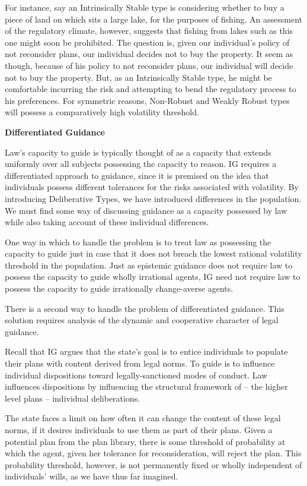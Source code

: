 For instance, say an Intrinsically Stable type is considering whether to
buy a piece of land on which sits a large lake, for the purposes of
fishing. An assessment of the regulatory climate, however, suggests that
fishing from lakes such as this one might soon be prohibited. The
question is, given our individual's policy of not reconsider plans, our
individual decides not to buy the property. It seem as though, because
of his policy to not reconsider plans, our individual will decide not to
buy the property. But, as an Intrinsically Stable type, he might be
comfortable incurring the risk and attempting to bend the regulatory
process to his preferences. For symmetric reasons, Non-Robust and Weakly
Robust types will possess a comparatively high volatility threshold.

\textbf{Differentiated Guidance}

Law's capacity to guide is typically thought of as a capacity that
extends uniformly over all subjects possessing the capacity to reason.
IG requires a differentiated approach to guidance, since it is premised
on the idea that individuals possess different tolerances for the risks
associated with volatility. By introducing Deliberative Types, we have
introduced differences in the population. We must find some way of
discussing guidance as a capacity possessed by law while also taking
account of these individual differences.

One way in which to handle the problem is to treat law as possessing the
capacity to guide just in case that it does not breach the lowest
rational volatility threshold in the population. Just as epistemic
guidance does not require law to possess the capacity to guide wholly
irrational agents, IG need not require law to possess the capacity to
guide irrationally change-averse agents.

There is a second way to handle the problem of differentiated guidance.
This solution requires analysis of the dynamic and cooperative character
of legal guidance.

Recall that IG argues that the state's goal is to entice individuals to
populate their plans with content derived from legal norms. To guide is
to influence individual dispositions toward legally-sanctioned modes of
conduct. Law influences dispositions by influencing the structural
framework of -- the higher level plans -- individual deliberations.

The state faces a limit on how often it can change the content of these
legal norms, if it desires individuals to use them as part of their
plans. Given a potential plan from the plan library, there is some
threshold of probability at which the agent, given her tolerance for
reconsideration, will reject the plan. This probability threshold,
however, is not permanently fixed or wholly independent of individuals'
wills, as we have thus far imagined.

